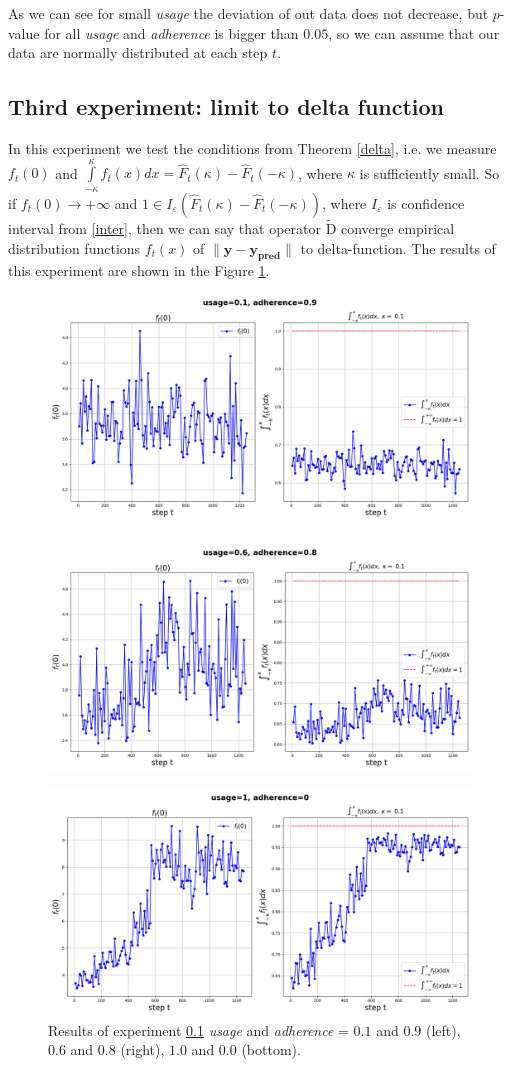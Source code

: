 \documentclass{article}
\begin{document}
        As we can see for small \textit{usage} the deviation of out data does not decrease, but $p$-value for all \textit{usage} and \textit{adherence} is bigger than $0.05$, so we can assume that our data are normally distributed at each step $t$.

    \subsection{Third experiment: limit to delta function} \label{exp_3}
        In this experiment we test the conditions from Theorem \ref{delta}, i.e. we measure $f_t(0)$ and $\int\limits_{-\kappa}^{\kappa}f_t(x)dx = \hat{F}_t(\kappa) - \hat{F}_t(-\kappa)$, where $\kappa$ is sufficiently small. So if $f_t(0) \to +\infty$ and $1 \in I_{\varepsilon}(\hat{F}_t(\kappa) - \hat{F}_t(-\kappa))$, where $I_{\varepsilon}$ is confidence interval from \eqref{inter}, then we can say that operator $\widetilde{\text{D}}$ converge empirical distribution functions $f_t(x)$ of $\|\mathbf{y} - \mathbf{y_{\text{pred}}}\|$ to delta-function. The results of this experiment are shown in the Figure \ref{fig_exp_3}.

        \begin{figure}[h!]
            \centering
            \includegraphics[width=0.49\linewidth]{pictures/f_t0_0.1_0.9.png}~~
            ~~\includegraphics[width=0.49\linewidth]{pictures/f_t0_0.6_0.8.png}
            
            \includegraphics[width=0.49\linewidth]{pictures/f_t0_1_0.png}
            
            \caption{Results of experiment \ref{exp_3} \textit{usage} and \textit{adherence} = $0.1$ and $0.9$ (left), $0.6$ and $0.8$ (right), $1.0$ and $0.0$ (bottom).}
            \label{fig_exp_3}
        \end{figure}
\end{document}

